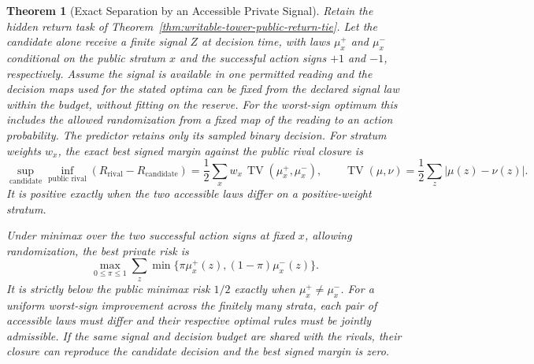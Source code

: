 \documentclass[11pt,a4paper]{article}
\newtheorem{theorem}{Theorem}[section]
\theoremstyle{definition}
\begin{document}
\begin{theorem}[Exact Separation by an Accessible Private Signal]\label{thm:writable-tower-private-return-separation}
Retain the hidden return task of Theorem~\ref{thm:writable-tower-public-return-tie}. Let the candidate alone receive a finite signal $Z$ at decision time, with laws $\mu_x^+$ and $\mu_x^-$ conditional on the public stratum $x$ and the successful action signs $+1$ and $-1$, respectively. Assume the signal is available in one permitted reading and the decision maps used for the stated optima can be fixed from the declared signal law within the budget, without fitting on the reserve. For the worst-sign optimum this includes the allowed randomization from a fixed map of the reading to an action probability. The predictor retains only its sampled binary decision. For stratum weights $w_x$, the exact best signed margin against the public rival closure is
\[
 \sup_{\text{candidate}}\inf_{\text{public rival}}(R_{\mathrm{rival}}-R_{\mathrm{candidate}})
 = \frac12 \sum_x w_x\,\operatorname{TV}(\mu_x^+,\mu_x^-),
 \qquad
 \operatorname{TV}(\mu,\nu)=\frac12\sum_z|\mu(z)-\nu(z)|.
\]
It is positive exactly when the two accessible laws differ on a positive-weight stratum.

Under minimax over the two successful action signs at fixed $x$, allowing randomization, the best private risk is
\[
 \max_{0\le\pi\le1}\sum_z
       \min\{\pi\mu_x^+(z),(1-\pi)\mu_x^-(z)\}.
\]
It is strictly below the public minimax risk $1/2$ exactly when $\mu_x^+\ne\mu_x^-$. For a uniform worst-sign improvement across the finitely many strata, each pair of accessible laws must differ and their respective optimal rules must be jointly admissible. If the same signal and decision budget are shared with the rivals, their closure can reproduce the candidate decision and the best signed margin is zero.
\end{theorem}
\end{document}
